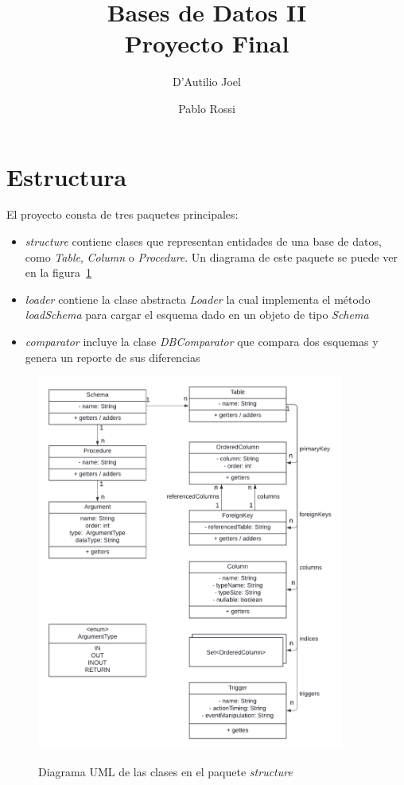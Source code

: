 \documentclass[11pt]{article}
\title{Bases de Datos II \\ \large Proyecto Final}
\author{D'Autilio Joel \and Pablo Rossi}
\begin{document}
       \maketitle

       \section{Estructura}

       El proyecto consta de tres paquetes principales:

       \begin{itemize}
              \item \textit{structure} contiene clases que representan entidades de una base de datos, como \textit{Table}, \textit{Column} o \textit{Procedure}.
              Un diagrama de este paquete se puede ver en la figura~\ref{fig:uml}
              \item \textit{loader} contiene la clase abstracta \textit{Loader} la cual implementa el método \textit{loadSchema} para cargar el esquema dado en un objeto de tipo \textit{Schema}
              \item \textit{comparator} incluye la clase \textit{DBComparator} que compara dos esquemas y genera un reporte de sus diferencias
       \end{itemize}

       \begin{figure}[ht]
              \centering
              \includegraphics[width=0.9\textwidth]{uml}\label{fig:uml}
              \caption{Diagrama UML de las clases en el paquete \textit{structure}}
       \end{figure}
\end{document}
